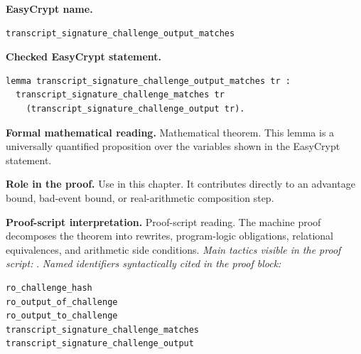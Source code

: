 \begin{formaltheorem}
\noindent\textbf{EasyCrypt name.}
\begin{lstlisting}[language=EasyCrypt,basicstyle=\ttfamily\scriptsize]
transcript_signature_challenge_output_matches
\end{lstlisting}
\noindent\textbf{Checked EasyCrypt statement.}
\begin{lstlisting}[language=EasyCrypt,basicstyle=\ttfamily\scriptsize]
lemma transcript_signature_challenge_output_matches tr :
  transcript_signature_challenge_matches tr
    (transcript_signature_challenge_output tr).
\end{lstlisting}
\noindent\textbf{Formal mathematical reading.}
Mathematical theorem. This lemma is a universally quantified proposition over the variables shown in the EasyCrypt statement.

\noindent\textbf{Role in the proof.}
Use in this chapter. It contributes directly to an advantage bound, bad-event bound, or real-arithmetic composition step.

\noindent\textbf{Proof-script interpretation.}
Proof-script reading. The machine proof decomposes the theorem into rewrites, program-logic obligations, relational equivalences, and arithmetic side conditions.
\emph{Main tactics visible in the proof script:} .
\emph{Named identifiers syntactically cited in the proof block:}
\begin{lstlisting}[language=EasyCrypt,basicstyle=\ttfamily\scriptsize]
ro_challenge_hash
ro_output_of_challenge
ro_output_to_challenge
transcript_signature_challenge_matches
transcript_signature_challenge_output
\end{lstlisting}

\end{formaltheorem}

